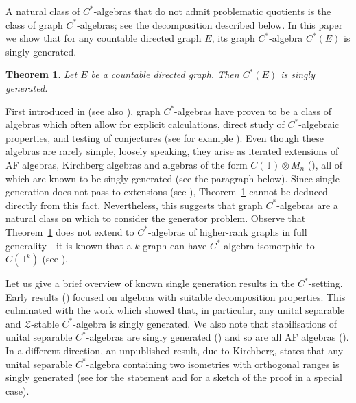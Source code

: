 \documentclass[12pt, a4paper]
{amsart}
\newtheorem{introthm}{Theorem}
\theoremstyle{definition}
\theoremstyle{remark}
\numberwithin{equation}{section}
\newcommand{\Cstar}{\ensuremath{C^*}}
\newcommand{\bT}{\ensuremath{\mathbb{T}}}
\newcommand{\cZ}{\ensuremath{\mathcal{Z}}}
\begin{document}
A natural class of \Cstar-algebras that do not admit problematic quotients is the class of graph \Cstar-algebras; see the decomposition described below. In this paper we show that for any countable directed graph $E$, its graph \Cstar-algebra $\Cstar(E)$ is singly generated. 

\begin{introthm}
\label{thm}
Let $E$ be a countable directed graph. 
Then $\Cstar(E)$ is singly generated.
\end{introthm}

First introduced in \cite{KPRR} (see also \cite{Fowler-Laca-Raeburn}), graph \Cstar-algebras have proven to be a class of algebras which often allow for explicit calculations, direct study of \Cstar-algebraic properties, and testing of conjectures (see for example \cite{RuizSimsTomforde15,SuriTomforde17,EilersGabeKatsuraRuizTomforde20,EilersKatsuraTomfordeWest16,EilersRestorffRuizSorensen21}).
Even though these algebras are rarely simple, loosely speaking, they arise as iterated extensions of AF algebras, Kirchberg algebras and algebras of the form $C(\bT)\otimes M_n$ (\cite{BatesPaskRaeburnWojciech00}), all of which are known to be singly generated (see the paragraph below). Since single generation does not pass to extensions (see \cite{T21}), Theorem~\ref{thm} cannot be deduced directly from this fact. Nevertheless, this suggests that graph \Cstar-algebras are a natural class on which to consider the generator problem.
Observe that Theorem~\ref{thm} does not extend to \Cstar-algebras of higher-rank graphs in full generality - it is known that a $k$-graph can have \Cstar-algebra isomorphic to $C(\bT^k)$ (see \cite[Example~1.7 (iii)]{Kumjian-Pask}).

Let us give a brief overview of known single generation results in the \Cstar-setting. 
Early results (\cite{Topping68,OlsenZame76,LiShen08}) focused on algebras with suitable decomposition properties. This culminated with the work \cite{TW14} which showed that, in particular, any unital separable and $\cZ$-stable \Cstar-algebra is singly generated. We also note that stabilisations of unital separable \Cstar-algebras are singly generated (\cite[Theorem~8]{OlsenZame76}) and so are all AF algebras (\cite{T21}). In a different direction, an unpublished result, due to Kirchberg, states that any unital separable \Cstar-algebra containing two isometries with orthogonal ranges is singly generated (see \cite[p.~138]{Nagisa04} for the statement and \cite[Theorem~2.4]{TW14} for a sketch of the proof in a special case).
\end{document}
